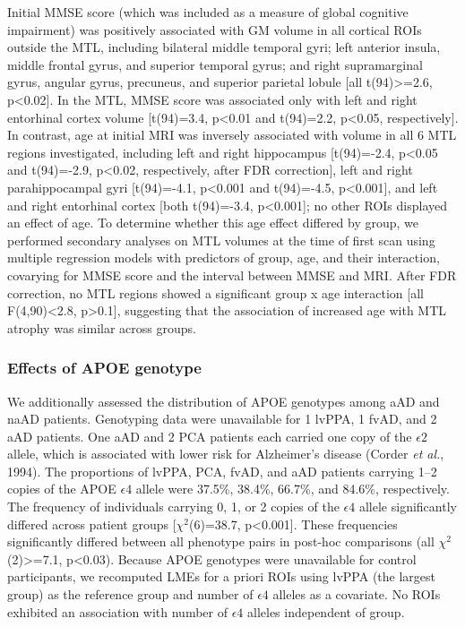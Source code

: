 \documentclass[]{article}
\begin{document}
Initial MMSE score (which was included as a measure of global cognitive
impairment) was positively associated with GM volume in all cortical
ROIs outside the MTL, including bilateral middle temporal gyri; left
anterior insula, middle frontal gyrus, and superior temporal gyrus; and
right supramarginal gyrus, angular gyrus, precuneus, and superior
parietal lobule {[}all t(94)\textgreater{}=2.6, p\textless{}0.02{]}. In
the MTL, MMSE score was associated only with left and right entorhinal
cortex volume {[}t(94)=3.4, p\textless{}0.01 and t(94)=2.2,
p\textless{}0.05, respectively{]}. In contrast, age at initial MRI was
inversely associated with volume in all 6 MTL regions investigated,
including left and right hippocampus {[}t(94)=-2.4, p\textless{}0.05 and
t(94)=-2.9, p\textless{}0.02, respectively, after FDR correction{]},
left and right parahippocampal gyri {[}t(94)=-4.1, p\textless{}0.001 and
t(94)=-4.5, p\textless{}0.001{]}, and left and right entorhinal cortex
{[}both t(94)=-3.4, p\textless{}0.001{]}; no other ROIs displayed an
effect of age. To determine whether this age effect differed by group,
we performed secondary analyses on MTL volumes at the time of first scan
using multiple regression models with predictors of group, age, and
their interaction, covarying for MMSE score and the interval between
MMSE and MRI. After FDR correction, no MTL regions showed a significant
group x age interaction {[}all F(4,90)\textless{}2.8,
p\textgreater{}0.1{]}, suggesting that the association of increased age
with MTL atrophy was similar across groups.

\subsubsection*{Effects of APOE
genotype}\label{effects-of-apoe-genotype}

We additionally assessed the distribution of APOE genotypes among aAD
and naAD patients. Genotyping data were unavailable for 1 lvPPA, 1 fvAD,
and 2 aAD patients. One aAD and 2 PCA patients each carried one copy of
the \(\epsilon2\) allele, which is associated with lower risk for
Alzheimer's disease (Corder \emph{et al.}, 1994). The proportions of
lvPPA, PCA, fvAD, and aAD patients carrying 1--2 copies of the APOE
\(\epsilon4\) allele were 37.5\%, 38.4\%, 66.7\%, and 84.6\%,
respectively. The frequency of individuals carrying 0, 1, or 2 copies of
the \(\epsilon4\) allele significantly differed across patient groups
{[}\(\chi^2\)(6)=38.7, p\textless{}0.001{]}. These frequencies
significantly differed between all phenotype pairs in post-hoc
comparisons (all \(\chi^2\)(2)\textgreater{}=7.1, p\textless{}0.03).
Because APOE genotypes were unavailable for control participants, we
recomputed LMEs for a priori ROIs using lvPPA (the largest group) as the
reference group and number of \(\epsilon4\) alleles as a covariate. No
ROIs exhibited an association with number of \(\epsilon4\) alleles
independent of group.
\end{document}
